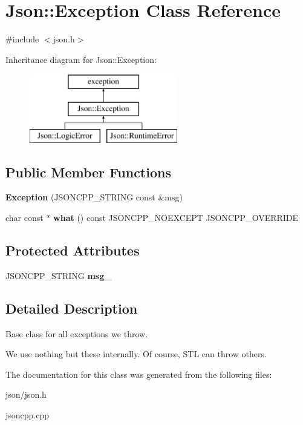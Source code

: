 \hypertarget{classJson_1_1Exception}{}\section{Json\+:\+:Exception Class Reference}
\label{classJson_1_1Exception}


{\ttfamily \#include $<$json.\+h$>$}

Inheritance diagram for Json\+:\+:Exception\+:\begin{figure}[H]
\begin{center}
\leavevmode
\includegraphics[height=3.000000cm]{classJson_1_1Exception}
\end{center}
\end{figure}
\subsection*{Public Member Functions}
\begin{DoxyCompactItemize}
\item 
\mbox{\label{classJson_1_1Exception_ae764aa42e0755bd4ce9d303e2733fa8f}} 
{\bfseries Exception} (J\+S\+O\+N\+C\+P\+P\+\_\+\+S\+T\+R\+I\+NG const \&msg)
\item 
\mbox{\label{classJson_1_1Exception_a70b7ce35e761fb93e8cd338e04619cd6}} 
char const  $\ast$ {\bfseries what} () const J\+S\+O\+N\+C\+P\+P\+\_\+\+N\+O\+E\+X\+C\+E\+PT J\+S\+O\+N\+C\+P\+P\+\_\+\+O\+V\+E\+R\+R\+I\+DE
\end{DoxyCompactItemize}
\subsection*{Protected Attributes}
\begin{DoxyCompactItemize}
\item 
\mbox{\label{classJson_1_1Exception_aae3cbb8b45bf21480f64502a8329659f}} 
J\+S\+O\+N\+C\+P\+P\+\_\+\+S\+T\+R\+I\+NG {\bfseries msg\+\_\+}
\end{DoxyCompactItemize}


\subsection{Detailed Description}
Base class for all exceptions we throw.

We use nothing but these internally. Of course, S\+TL can throw others. 

The documentation for this class was generated from the following files\+:\begin{DoxyCompactItemize}
\item 
json/json.\+h\item 
jsoncpp.\+cpp\end{DoxyCompactItemize}
